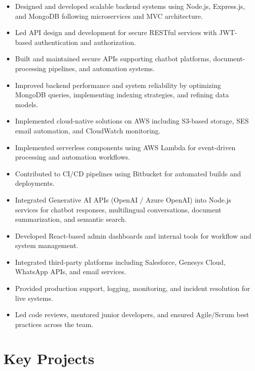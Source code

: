 \documentclass[a4paper,10pt]{article}
\begin{document}
\begin{itemize}[leftmargin=*,itemsep=0.2em]
    \item Designed and developed scalable backend systems using Node.js, Express.js, and MongoDB following microservices and MVC architecture.
    \item Led API design and development for secure RESTful services with JWT-based authentication and authorization.
    \item Built and maintained secure APIs supporting chatbot platforms, document-processing pipelines, and automation systems.
    \item Improved backend performance and system reliability by optimizing MongoDB queries, implementing indexing strategies, and refining data models.
    \item Implemented cloud-native solutions on AWS including S3-based storage, SES email automation, and CloudWatch monitoring.
    \item Implemented serverless components using AWS Lambda for event-driven processing and automation workflows.
    \item Contributed to CI/CD pipelines using Bitbucket for automated builds and deployments.
    \item Integrated Generative AI APIs (OpenAI / Azure OpenAI) into Node.js services for chatbot responses, multilingual conversations, document summarization, and semantic search.
    \item Developed React-based admin dashboards and internal tools for workflow and system management.
    \item Integrated third-party platforms including Salesforce, Genesys Cloud, WhatsApp APIs, and email services.
    \item Provided production support, logging, monitoring, and incident resolution for live systems.
    \item Led code reviews, mentored junior developers, and ensured Agile/Scrum best practices across the team.
\end{itemize}

\vspace{-2mm}
\noindent\makebox[\linewidth]{\rule{\linewidth}{0.4pt}}

\section*{Key Projects}
\vspace{0.5em}
\end{document}

